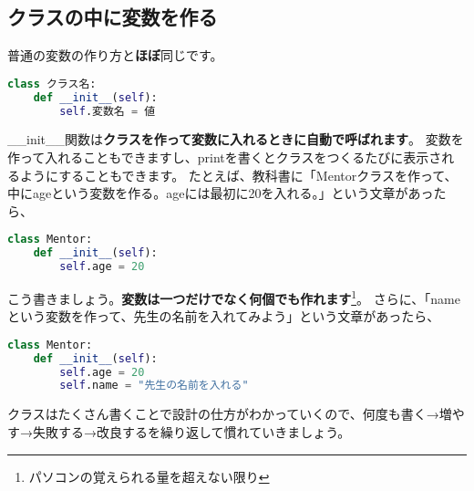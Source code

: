 \subsection{クラスの中に変数を作る}
普通の変数の作り方と\textbf{ほぼ}同じです。
\begin{lstlisting}[caption=クラスの中に変数を作る,label=sample, language=Python]
class クラス名:
    def __init__(self):
        self.変数名 = 値
\end{lstlisting}
\_\_init\_\_関数は\textbf{クラスを作って変数に入れるときに自動で呼ばれます}。
変数を作って入れることもできますし、printを書くとクラスをつくるたびに表示されるようにすることもできます。
たとえば、教科書に「Mentorクラスを作って、中にageという変数を作る。ageには最初に20を入れる。」という文章があったら、
\begin{lstlisting}[caption=Mentorクラスの作り方,label=sample, language=Python]
class Mentor:
    def __init__(self):
        self.age = 20
\end{lstlisting}
こう書きましょう。\textbf{変数は一つだけでなく何個でも作れます}\footnote{パソコンの覚えられる量を超えない限り}。
さらに、「nameという変数を作って、先生の名前を入れてみよう」という文章があったら、
\begin{lstlisting}[caption=Mentorクラスの作り方,label=sample, language=Python]
class Mentor:
    def __init__(self):
        self.age = 20
        self.name = "先生の名前を入れる"
\end{lstlisting}
クラスはたくさん書くことで設計の仕方がわかっていくので、何度も書く→増やす→失敗する→改良するを繰り返して慣れていきましょう。

